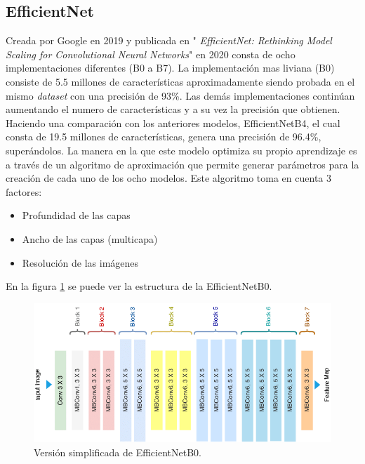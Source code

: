 \subsection{EfficientNet}

Creada por Google en 2019 y publicada en " \textit{EfficientNet: Rethinking Model Scaling for Convolutional Neural Networks}" \cite{Tan2020} en 2020 consta de ocho implementaciones diferentes (B0 a B7). La implementación mas liviana (B0) consiste de 5.5 millones de características aproximadamente siendo probada en el mismo \textit{dataset} con una precisión de 93\%. Las demás implementaciones continúan aumentando el numero de características y a su vez la precisión que obtienen. Haciendo una comparación con los anteriores modelos, EfficientNetB4, el cual consta de 19.5 millones de características, genera una precisión de 96.4\%, superándolos. La manera en la que este modelo optimiza su propio aprendizaje es a través de un algoritmo de aproximación que permite generar parámetros para la creación de cada uno de los ocho modelos. Este algoritmo toma en cuenta 3 factores:

\begin{itemize}
    \item Profundidad de las capas
    \item Ancho de las capas (multicapa)
    \item Resolución de las imágenes
\end{itemize}
En la figura \ref{EfficientNetB0} se puede ver la estructura de la EfficientNetB0. 


\begin{figure}[h!]
\includegraphics[width=1\textwidth]{images/EfficientNetB0.png}
\centering
\caption{Versión simplificada de EfficientNetB0. \protect\cite{EfficientNetB0} }
\label{EfficientNetB0}
\end{figure}

